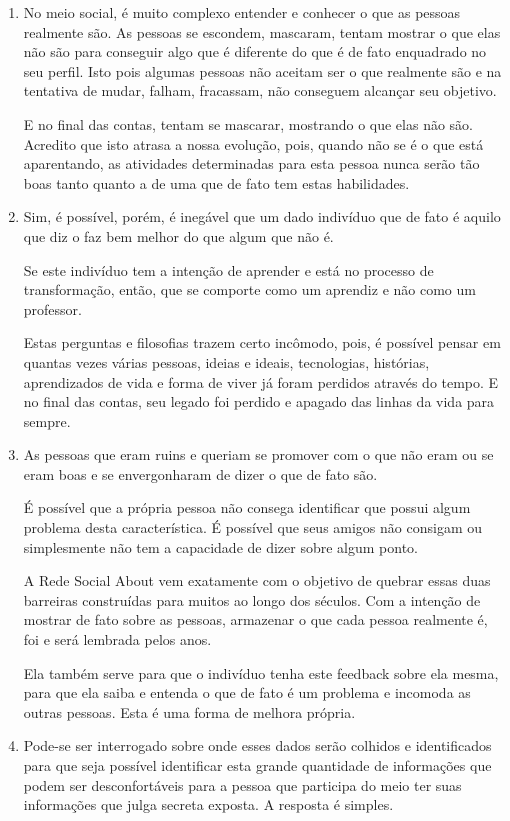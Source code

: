 \begin{enumerate}
    \item No meio social, é muito complexo entender e conhecer o que as 
        pessoas
        realmente são. As pessoas se escondem, mascaram, tentam mostrar o que elas não
        são para conseguir algo que é diferente do que é de fato enquadrado no seu
        perfil. Isto pois algumas pessoas não aceitam ser o que realmente são e na
        tentativa de mudar, falham, fracassam, não conseguem alcançar seu objetivo.

        E no final das contas, tentam se mascarar, mostrando o que elas não são.
        Acredito que isto atrasa a nossa evolução, pois, quando não se é o que está
        aparentando, as atividades determinadas para esta pessoa nunca serão tão
        boas tanto quanto a de uma que de fato tem estas habilidades.

    \item Sim, é possível, porém, é inegável que um
        dado indivíduo que de fato é aquilo que diz o faz bem melhor do que algum
        que não é.

        Se este indivíduo tem a intenção de aprender e está no processo de transformação,
        então, que se comporte como um aprendiz e não como um professor.

        Estas perguntas e filosofias trazem certo incômodo, pois, é possível pensar em quantas 
        vezes várias
        pessoas, ideias e ideais, tecnologias, histórias, aprendizados de vida e forma de
        viver já foram perdidos através do tempo. E no final das contas, seu legado foi
        perdido e apagado das linhas da vida para sempre.

    \item As pessoas que eram ruins e queriam se promover com o que não eram 
        ou se eram boas e se envergonharam de dizer o que de fato são.

        É possível que a própria pessoa não consega identificar que possui algum problema
        desta característica. É possível que seus amigos não
        consigam ou simplesmente não tem a capacidade de dizer sobre algum ponto.

        A Rede Social About vem exatamente com o objetivo de quebrar essas duas barreiras construídas
        para muitos ao longo dos séculos. Com a intenção de mostrar de fato sobre as pessoas,
        armazenar o que cada pessoa realmente é, foi e será lembrada pelos anos.

        Ela também serve para que o indivíduo tenha este feedback sobre ela mesma, para que ela
        saiba e entenda o que de fato é um problema e incomoda as outras pessoas. Esta é uma forma
        de melhora própria. 
    \item Pode-se ser interrogado sobre onde esses dados serão colhidos e identificados para que seja
        possível identificar esta grande quantidade de informações que podem ser desconfortáveis
        para a pessoa que participa do meio ter suas informações que julga secreta exposta. A resposta
        é simples.


\end{enumerate}
